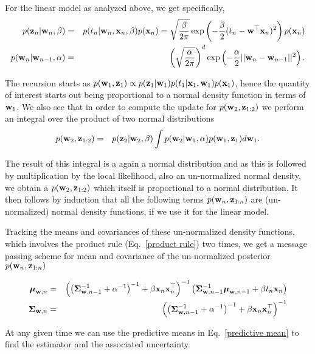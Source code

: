 \documentclass[A4,12pt]{article}    %
\def\xb{{\bf x}}
\def\zb{{\bf z}}
\def\wb{{\bf w}}
\def\mub{\text{\boldmath $\mu$}}
\def\Sigb{\text{\boldmath $\Sigma$}}
\def\xb{{\bf x}}
\begin{document}
For the linear model as analyzed above, we get specifically,
\begin{eqnarray}
 p(\zb_n|\wb_n,\beta)   &=& p(t_n|\wb_n,\xb_n,\beta)p(\xb_n) = \sqrt{\frac{\beta}{2\pi}}\exp\left(-\frac{\beta}{2}(t_n-\wb^{\top}\xb_n )^2 \right)p(\xb_n) \nonumber \\
 p(\wb_n|\wb_{n-1},\alpha) &=&  \left(\sqrt{\frac{\alpha}{2\pi}}\right)^{d} \exp\left(-\frac{\alpha}{2}||\wb_n-\wb_{n-1}||^2\right). \nonumber
\end{eqnarray}

The recursion starts as  $p(\wb_1 ,\zb_1) \propto p(\zb_{1}|\wb_1) p(t_{1}|\xb_1,\wb_1)p(\xb_1)$, hence the quantity of interest starts out being proportional to a normal density function in terms of $\wb_1$.
We also see that in order to compute the update for $p(\wb_2 ,\zb_{1:2})$ we perform an integral over the product of two normal distributions
\begin{eqnarray}
 p(\wb_2 ,\zb_{1:2}) &=& p(\zb_{2}|\wb_2,\beta)\int p(\wb_2 | \wb_1,\alpha)p(\wb_1,\zb_1)d\wb_{1}.
\end{eqnarray}

 The result of this integral is a again a normal distribution and as this is followed by multiplication by the local likelihood, also an un-normalized normal density, we obtain a $p(\wb_2 ,\zb_{1:2})$ which itself is proportional to a normal distribution. It then follows by induction that all the following terms $p(\wb_n ,\zb_{1:n})$ are (un-normalized) normal density functions, if we use it for the linear model.

 Tracking the  means and covariances of these un-normalized density functions, which involves the product rule (Eq.\ \ref{product rule}) two times, we get a message passing scheme for mean and covariance of the un-normalized posterior $ p(\wb_n , \zb_{1:n}) $

\begin{eqnarray}
  \mub_{\wb,n} & = &  \left( \left( \Sigb_{\wb,n-1}^{-1} + \alpha^{-1}\right)^{-1} + \beta\xb_n\xb_n^{\top}\right)^{-1}\left( \Sigb_{\wb,n-1}^{-1}\mub_{\wb,n-1} + \beta t_n\xb_n\right) \nonumber \\
  \Sigb_{\wb,n} & = & \left( \left(\Sigb_{\wb,n-1}^{-1} + \alpha^{-1}\right)^{-1} + \beta\xb_n\xb_n^{\top}\right)^{-1}
  \end{eqnarray}

At any given time we can use the predictive means in Eq.\ \ref{predictive mean} to find the estimator and the associated uncertainty.
\end{document}
